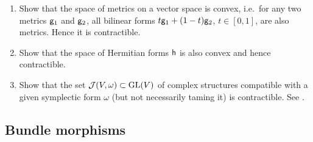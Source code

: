 \begin{xca}
    \begin{enumerate}
        \item Show that the space of metrics on a vector space is convex, i.e.\ for any two metrics $\mathsf{g}_1$ and $\mathsf{g}_2$, all bilinear forms $t\mathsf{g}_1+(1-t)\mathsf{g}_2$, $t\in[0,1]$, are also metrics. Hence it is contractible.
        \item Show that the space of Hermitian forms $\mathsf{h}$ is also convex and hence contractible.
        \item Show that the set $\mathcal{J}(V,\omega)\subset \operatorname{GL}(V)$ of complex structures compatible with a given symplectic form $\omega$ (but not necessarily taming it) is contractible. See \cite[Prop.~7.5.7]{RS1}.
    \end{enumerate}
\end{xca}







\subsection{Bundle morphisms}


